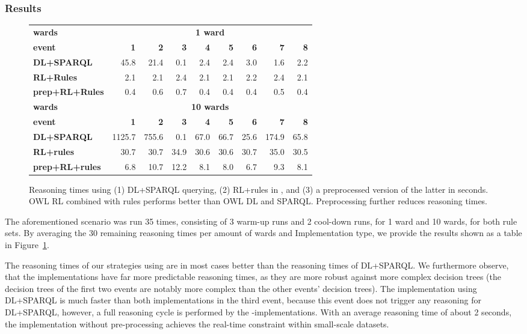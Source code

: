 \subsubsection{Results}
\begin{figure}  
\begin{center}
\begin{tabular}[b]{l| rrrrrrrr }
 \hline
 \bf wards&\multicolumn{8}{c}{\bf 1 ward} \\
 \bf event&\bf1&\bf2&\bf3&\bf4&\bf5&\bf6&\bf7&\bf8\\ 
   \hline
\bf  DL+SPARQL
  &45.8
  &21.4
  &0.1
  &2.4
  &2.4
  &3.0
  &1.6
  &2.2
  \\
\bf   RL+Rules 
&2.1&
2.1&
2.4&
2.1&
2.1&
2.2&
2.4&
2.1
\\
 \bf  prep+RL+Rules &
0.4&
0.6&
0.7&
0.4&
0.4&
0.4&
0.5&
0.4
 \\
  \hline
 \bf wards& \multicolumn{8}{c}{\bf 10 wards} \\
 \bf event& \bf1&\bf2&\bf3&\bf4&\bf5&\bf6&\bf7&\bf8\\
     \hline
 \bf DL+SPARQL
  &1125.7
&755.6
&0.1
&67.0
&66.7
&25.6
&174.9
&65.8
  \\
  \bf RL+rules 
 & 30.7&
30.7&
34.9&
30.6&
30.6&
30.7&
35.0&
30.5
\\
 \bf  prep+RL+rules &
  6.8&
10.7&
12.2&
8.1&
8.0&
6.7&
9.3&
8.1
 \\
  \hline
\end{tabular}
\end{center}
\caption{Reasoning times using (1) DL+SPARQL querying, 
(2) RL+rules in \nthree, and (3) a preprocessed version of the latter in seconds. OWL RL combined with rules performs better than OWL DL and SPARQL.
Preprocessing further reduces reasoning times.}
\label{fig:resultstable}
\end{figure}
The aforementioned scenario was run 35 times, consisting of 3 warm-up runs and 2 cool-down runs, for 1 ward and 10 wards, for both rule sets.
By averaging the 30 remaining reasoning times per amount of wards and Implementation type, we provide the results shown as a table in Figure~\ref{fig:resultstable}. 


The reasoning times of our strategies using \nthree are in most cases better than the reasoning times of DL+SPARQL. 
We furthermore observe, that the \nthree implementations have far 
more predictable reasoning times, as they are more robust against more complex decision trees
(\eg the decision trees of the first two events are notably more complex than the other events' decision trees).
The implementation using DL+SPARQL is much faster than both \nthree implementations in the third event, because this event does not trigger any reasoning for DL+SPARQL, however, 
a full reasoning cycle is performed by the \nthree-implementations. 
With an average reasoning time of about 2 seconds, the \nthree implementation without pre-processing achieves the real-time constraint within small-scale datasets.

